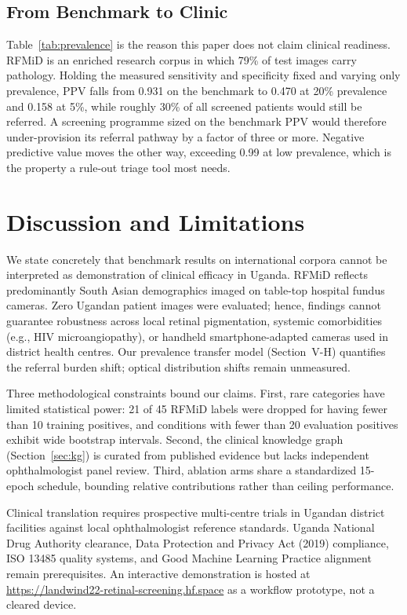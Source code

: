 \documentclass[11pt]{IEEEtran}
\begin{document}
\subsection{From Benchmark to Clinic}
Table~\ref{tab:prevalence} is the reason this paper does not claim clinical readiness. RFMiD is an
enriched research corpus in which 79\% of test images carry pathology. Holding the measured
sensitivity and specificity fixed and varying only prevalence, PPV falls from 0.931 on the
benchmark to 0.470 at 20\% prevalence and 0.158 at 5\%, while roughly 30\% of all screened
patients would still be referred. A screening programme sized on the benchmark PPV would
therefore under-provision its referral pathway by a factor of three or more. Negative predictive
value moves the other way, exceeding 0.99 at low prevalence, which is the property a
rule-out triage tool most needs.



\section{Discussion and Limitations}

We state concretely that benchmark results on international corpora cannot be interpreted as demonstration
of clinical efficacy in Uganda. RFMiD reflects predominantly South Asian demographics imaged on
table-top hospital fundus cameras. Zero Ugandan patient images were evaluated; hence, findings cannot
guarantee robustness across local retinal pigmentation, systemic comorbidities (e.g., HIV microangiopathy),
or handheld smartphone-adapted cameras used in district health centres. Our prevalence transfer model
(Section~V-H) quantifies the referral burden shift; optical distribution shifts remain unmeasured.

Three methodological constraints bound our claims. First, rare categories have limited statistical
power: 21 of 45 RFMiD labels were dropped for having fewer than 10 training positives, and conditions
with fewer than 20 evaluation positives exhibit wide bootstrap intervals. Second, the clinical knowledge
graph (Section~\ref{sec:kg}) is curated from published evidence but lacks independent ophthalmologist
panel review. Third, ablation arms share a standardized 15-epoch schedule, bounding relative contributions
rather than ceiling performance.

Clinical translation requires prospective multi-centre trials in Ugandan district facilities against
local ophthalmologist reference standards. Uganda National Drug Authority clearance, Data Protection
and Privacy Act (2019) compliance, ISO 13485 quality systems, and Good Machine Learning Practice alignment
remain prerequisites. An interactive demonstration is hosted at \url{https://landwind22-retinal-screening.hf.space}
as a workflow prototype, not a cleared device.
\end{document}
